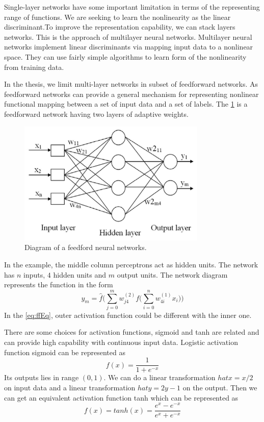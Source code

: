 Single-layer networks have some important limitation in terms of the representing range of functions. We are seeking to learn the nonlinearity as the linear discriminant.To improve the representation capability, we can stack layers networks. This is the approach of multilayer neural networks. Multilayer neural networks implement linear discriminants via mapping input data to a nonlinear space. They can use fairly simple algorithms to learn form of the nonlinearity from training data.

In the thesis, we limit multi-layer networks in subset of feedforward networks. As feedforward networks can provide a general mechanism for representing nonlinear functional mapping between a set of input data and a set of labels. The \ref{fig:ffnet} is a feedforward network having two layers of adaptive weights.
\begin{figure}
\centering
\includegraphics[width=0.8\textwidth]{Figure2-2.png}
\caption{\label{fig:ffnet}Diagram of a feedford neural networks.}
\end{figure}
In the example, the middle column perceptrons act as hidden units. The network has $n$ inputs, $4$ hidden units and $m$ output units. The network diagram represents the function in the form
\begin{equation}\label{eq:ffEq}
y_{m} = \hat{f}\Big(\sum_{j=0}^{m}w_{j4}^{(2)}f\big(\sum_{i=0}^{n}w_{4i}^{(1)}x_{i}\big)\Big)
\end{equation}
In the \ref{eq:ffEq}, outer activation function could be different with the inner one.

There are some choices for activation functions, sigmoid and tanh are related and can provide high capability with continuous input data. Logistic activation function sigmoid can be represented as 
\begin{equation}\label{eq:sigmoid}
f(x) = \frac{1}{1+e^{-x}}
\end{equation}
Its outputs lies in range $(0,1)$. We can do a linear transformation $hat{x}=x/2$ on input data and a linear transformation $hat{y}=2y-1$ on the output. Then we can get an equivalent activation function tanh which can be represented as
\begin{equation}\label{eq:tanh}
f(x) = tanh(x) = \frac{e^{x}-e^{-x}}{e^{x}+e^{-x}}
\end{equation}

